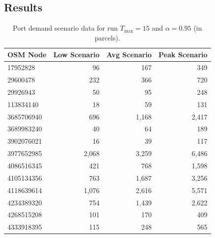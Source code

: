 \documentclass[12pt]{article}
\begin{document}
\subsection{Results}
\label{subsec:appendix-results}

\begin{table}[htbp]
  \centering
  \caption{Port demand scenario data for run \(T_{\max}=15\) and \(\alpha=0.95\) (in parcels).}
  \label{anx:port_demand_scenarios_t15_a095}
  \begin{tabular}{lrrr}
    \toprule
    \textbf{OSM Node} & \textbf{Low Scenario} & \textbf{Avg Scenario} & \textbf{Peak Scenario} \\
    \midrule
    17952828          & 96                    & 167                   & 349                    \\
    29600478          & 232                   & 366                   & 720                    \\
    29926943          & 50                    & 95                    & 248                    \\
    113834140         & 18                    & 59                    & 131                    \\
    3685706940        & 696                   & 1,168                 & 2,417                  \\
    3689983240        & 40                    & 64                    & 189                    \\
    3902076021        & 16                    & 39                    & 117                    \\
    3977652985        & 2,068                 & 3,259                 & 6,486                  \\
    4086516345        & 421                   & 768                   & 1,598                  \\
    4105134356        & 763                   & 1,687                 & 3,256                  \\
    4118639614        & 1,076                 & 2,616                 & 5,571                  \\
    4234389320        & 754                   & 1,439                 & 2,622                  \\
    4268515208        & 101                   & 170                   & 409                    \\
    4333918395        & 115                   & 248                   & 565                    \\

\end{tabular}
\end{table}
\end{document}
